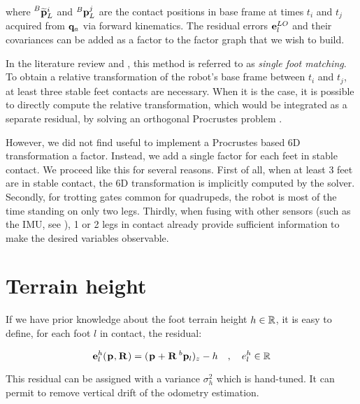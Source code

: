 %
where $\prescript{B}{}{\widetilde{{\bf p}}}_{L}^i$ and $\prescript{B}{}{{\bf p}}_{L}^j$ are the contact positions in base frame at times $t_i$ and $t_j$ acquired from ${\bf q}_a$ via forward kinematics. 
The residual errors ${\bf e}^{LO}_l$ and their covariances can be added as a factor to the factor graph that we wish to build.

In the literature review and , this method is referred to as \textit{single foot matching}. To obtain
a relative transformation of the robot's base frame between $t_i$ and $t_j$, at least three stable feet contacts are necessary. When it is the case, it is possible to directly compute the
relative transformation, which would be integrated as a separate residual, by solving an orthogonal Procrustes problem \cite{roston1991dead}.

However, we did not find useful to implement a Procrustes based 6D transformation a factor. Instead, we add a single factor for each feet in stable contact. We proceed like this for several reasons. First of all, when at least 3 feet are in stable contact, the 6D transformation is implicitly computed by the solver.
Secondly, for trotting gates common for quadrupeds, the robot is most of the time standing on only two legs. Thirdly, when fusing with other sensors (such as the IMU,
see ), 1 or 2 legs in contact already provide sufficient information to make the desired variables observable.



\section{Terrain height}
If we have prior knowledge about the foot terrain height $h \in \mathbb{R}$, it is easy to define, for each foot $l$ in contact, the residual:

\begin{equation}
    {\bf e}^h_l(\prescript{}{}{{\bf p}}_{}, \prescript{}{}{{\bf R}}_{}) = (\prescript{}{}{{\bf p}}_{} + \prescript{}{}{{\bf R}}_{} \prescript{b}{}{{\bf p}}_{l})_z - h \quad, \quad e^{h}_l \in \mathbb{R}
\end{equation}

This residual can be assigned with a variance $\sigma_h^2$ which is hand-tuned. 
It can permit to remove vertical drift of the odometry estimation.



